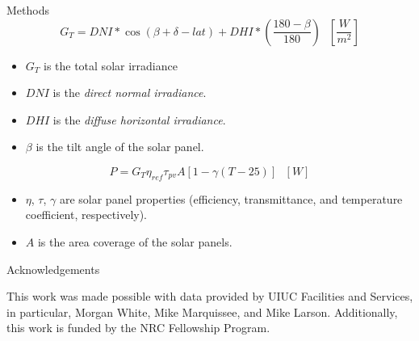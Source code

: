 \documentclass[final]{beamer}
\newlength{\onecolwid}
\newlength{\threecolwid}
\begin{document}
\begin{frame}[t]
\begin{columns}[t,totalwidth=\threecolwid]
\begin{column}{\onecolwid}
\begin{block}{Methods}
\begin{equation}
	G_T = DNI*\cos\left(\beta+\delta-lat\right) + DHI*\left(\frac{180-\beta}{180}\right) \text{ } \left[\frac{W}{m^2}\right]
\end{equation}
\small{
	\begin{itemize}
		\item $G_T$ is the total solar irradiance
		\item $DNI$ is the \textit{direct normal irradiance}.
		\item $DHI$ is the \textit{diffuse horizontal irradiance}.
		\item $\beta$ is the tilt angle of the solar panel.
	\end{itemize}
}

\begin{equation}
	P = G_T\eta_{ref}\tau_{pv}A\left[1-\gamma\left(T-25\right)\right] \text{ } \left[W\right]
\end{equation}

\small{
	\begin{itemize}
		\item $\eta$, $\tau$, $\gamma$ are solar panel properties (efficiency, transmittance, and temperature coefficient, respectively).
		\item $A$ is the area coverage of the solar panels.
	\end{itemize}
}


\end{block}




\begin{block}{Acknowledgements}
	
This work was made possible with data provided by UIUC Facilities and Services, 
in particular, Morgan White, Mike Marquissee, and Mike Larson. Additionally, 
this work is funded by the NRC Fellowship Program.  
	
\end{block}




\end{column}
\end{columns}
\end{frame}
\end{document}

